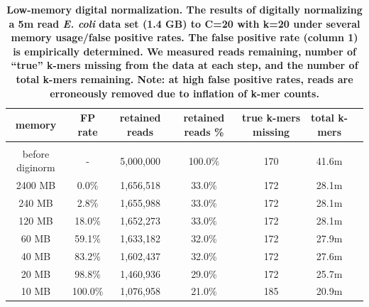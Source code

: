 \documentclass[10pt]{article}
\begin{document}
\begin{table}[!ht]
\caption{ \bf{Low-memory digital normalization. The results of
    digitally normalizing a 5m read {\em E. coli} data set (1.4 GB) to C=20
    with k=20 under several memory usage/false positive rates.  The
    false positive rate (column 1) is empirically determined.  We
    measured reads remaining, number of ``true'' k-mers missing from
    the data at each step, and the number of total k-mers remaining.
    Note: at high false positive rates, reads are erroneously removed due to
    inflation of k-mer counts.}}
\begin{tabular}{ | c | c | c | c | c | c | c |}
memory   & FP rate & retained reads & retained reads \% & true k-mers missing & total k-mers \\
\hline \\
before diginorm   &  -      & 5,000,000   & 100.0\%    & 170  &  41.6m \\
2400 MB           &   0.0\% & 1,656,518   &  33.0\%    & 172  &  28.1m \\
240 MB            &   2.8\% & 1,655,988   &  33.0\%    & 172  &  28.1m \\
120 MB            &  18.0\% & 1,652,273   &  33.0\%    & 172  &  28.1m \\
60 MB             &  59.1\% & 1,633,182   &  32.0\%    & 172  &  27.9m \\
40 MB             &  83.2\% & 1,602,437   &  32.0\%    & 172  &  27.6m \\
20 MB             &  98.8\% & 1,460,936   &  29.0\%    & 172  &  25.7m \\
10 MB             & 100.0\% & 1,076,958   &  21.0\%    & 185  &  20.9m \\
\end{tabular}
\begin{flushleft}
\end{flushleft}
\label{table:loop_norm}
\end{table}

\end{document}
